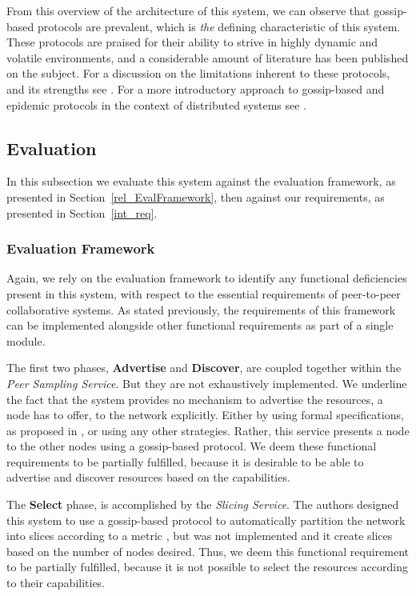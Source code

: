 \documentclass[12pt, titlepage]{uo_temp}
\begin{document}
     From this overview of the architecture of this system, we can observe that gossip-based
     protocols are prevalent, which is \emph{the} defining characteristic of this system. These
     protocols are praised for their ability to strive in highly dynamic and volatile
     environments, and a considerable amount of literature has been published on the
     subject. For a discussion on the limitations inherent to these protocols,
     and its strengths see \cite{birman2007promise}. For a more introductory approach to
     gossip-based and epidemic protocols in the context of distributed systems see
     \cite{jelasitygossip}.
     

     \subsection{Evaluation}
     In this subsection we evaluate this system against the evaluation
     framework, as presented in Section~\ref{rel_EvalFramework}, then against our
     requirements, as presented in Section~\ref{int_req}.
     
     \subsubsection{Evaluation Framework}
     Again, we rely on the evaluation framework to identify any functional deficiencies
     present in this system, with respect to the essential requirements of peer-to-peer
     collaborative systems. As stated previously, the requirements of this framework can
     be implemented alongside other functional requirements as part of a single module.

     The first two phases, \textbf{Advertise} and \textbf{Discover}, are coupled together
     within the \emph{Peer Sampling Service}. But they are not exhaustively
     implemented. We underline the fact that the system provides no mechanism to advertise
     the resources, a node has to offer, to the network explicitly. Either by using formal
     specifications, as proposed in \cite{p2p_collab}, or using any other
     strategies. Rather, this service presents a node to the other nodes using a
     gossip-based protocol. We deem these functional requirements to be partially
     fulfilled, because it is desirable to be able to advertise and discover resources
     based on the capabilities.

     The \textbf{Select} phase, is accomplished by the \emph{Slicing Service}. The authors
     designed this system to use a gossip-based protocol to automatically partition the
     network into slices according to a metric \cite{jelasity2006ordered}, but was not
     implemented and it create slices based on the number of nodes desired. Thus, we deem
     this functional requirement to be partially fulfilled, because it is not possible to
     select the resources according to their capabilities.
     
\end{document}
